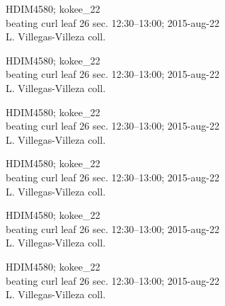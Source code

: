 \documentclass[2pt]{extarticle}
\begin{document}
\noindent
\parbox{0.16\textwidth}{\tiny \raggedright \rule[-0.3\baselineskip]{0pt}{10pt}HDIM4580; kokee\_22\\ beating curl leaf 26 sec. 12:30--13:00; 2015-aug-22\\ L. Villegas-Villeza coll.}
\parbox{0.16\textwidth}{\tiny \raggedright \rule[-0.3\baselineskip]{0pt}{10pt}HDIM4580; kokee\_22\\ beating curl leaf 26 sec. 12:30--13:00; 2015-aug-22\\ L. Villegas-Villeza coll.}
\parbox{0.16\textwidth}{\tiny \raggedright \rule[-0.3\baselineskip]{0pt}{10pt}HDIM4580; kokee\_22\\ beating curl leaf 26 sec. 12:30--13:00; 2015-aug-22\\ L. Villegas-Villeza coll.}
\parbox{0.16\textwidth}{\tiny \raggedright \rule[-0.3\baselineskip]{0pt}{10pt}HDIM4580; kokee\_22\\ beating curl leaf 26 sec. 12:30--13:00; 2015-aug-22\\ L. Villegas-Villeza coll.}
\parbox{0.16\textwidth}{\tiny \raggedright \rule[-0.3\baselineskip]{0pt}{10pt}HDIM4580; kokee\_22\\ beating curl leaf 26 sec. 12:30--13:00; 2015-aug-22\\ L. Villegas-Villeza coll.}
\parbox{0.16\textwidth}{\tiny \raggedright \rule[-0.3\baselineskip]{0pt}{10pt}HDIM4580; kokee\_22\\ beating curl leaf 26 sec. 12:30--13:00; 2015-aug-22\\ L. Villegas-Villeza coll.} \\ 
\vspace{0.001in} 
\end{document}
